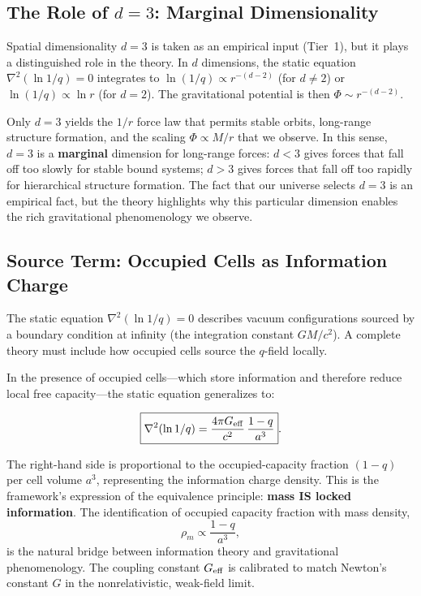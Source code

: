 \documentclass[aps,prd,twocolumn,showpacs,superscriptaddress,preprintnumbers]{revtex4-2}
\begin{document}
\subsection{The Role of $d=3$: Marginal Dimensionality}
\label{sec:d3}

Spatial dimensionality $d=3$ is taken as an empirical input (Tier~1), but it plays a distinguished role in the theory.
In $d$ dimensions, the static equation $\nabla^2(\ln 1/q)=0$ integrates to $\ln(1/q)\propto r^{-(d-2)}$ (for $d\neq2$) or $\ln(1/q)\propto\ln r$ (for $d=2$).
The gravitational potential is then $\Phi\sim r^{-(d-2)}$.

Only $d=3$ yields the $1/r$ force law that permits stable orbits, long-range structure formation, and the scaling $\Phi\propto M/r$ that we observe.
In this sense, $d=3$ is a \textbf{marginal} dimension for long-range forces: $d<3$ gives forces that fall off too slowly for stable bound systems; $d>3$ gives forces that fall off too rapidly for hierarchical structure formation.
The fact that our universe selects $d=3$ is an empirical fact, but the theory highlights why this particular dimension enables the rich gravitational phenomenology we observe.

\subsection{Source Term: Occupied Cells as Information Charge}
\label{sec:source}

The static equation $\nabla^2(\ln 1/q)=0$ describes vacuum configurations sourced by a boundary condition at infinity (the integration constant $GM/c^2$).
A complete theory must include how occupied cells source the $q$-field locally.

In the presence of occupied cells---which store information and therefore reduce local free capacity---the static equation generalizes to:

\begin{equation}
\boxed{\nabla^2(\ln 1/q) = \frac{4\pi G_{\rm eff}}{c^2}\,\frac{1-q}{a^3}}.
\label{eq:poisson_source}
\end{equation}

The right-hand side is proportional to the occupied-capacity fraction $(1-q)$ per cell volume $a^3$, representing the information charge density.
This is the framework's expression of the equivalence principle: \textbf{mass IS locked information}.
The identification of occupied capacity fraction with mass density,
\begin{equation}
\rho_m \propto \frac{1-q}{a^3},
\end{equation}
is the natural bridge between information theory and gravitational phenomenology.
The coupling constant $G_{\rm eff}$ is calibrated to match Newton's constant $G$ in the nonrelativistic, weak-field limit.
\end{document}
